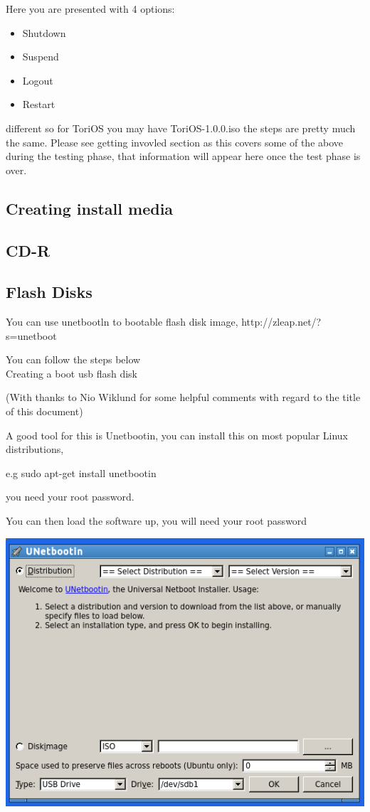 \documentclass[12pt,a4paper]{book}
\begin{document}
Here you are presented with 4 options:\\
\begin{itemize}
\item{Shutdown}
\item{Suspend}
\item{Logout}
\item{Restart}

\end{itemize}
 different so for ToriOS you may have ToriOS-1.0.0.iso the steps are pretty much the same.  
Please see getting invovled section as this covers some of the above during the testing phase,  that information will appear here once the test phase is over. 
\subsection{Creating install media}

\subsection{CD-R}


\subsection{Flash Disks}

You can use unetbootln to bootable flash disk image,   http://zleap.net/?s=unetboot

You can follow the steps below \\

Creating a boot usb flash disk

(With thanks to Nio Wiklund for some helpful comments with regard to the title of this document)

A good tool for this is Unetbootin,  you can install this on most popular Linux distributions,

e.g sudo apt-get install unetbootin

you need your root password.

You can then load the software up, you will need your root password

\newpage




\begin{center}
\includegraphics[width=0.7\linewidth]{unetbootin} 
\end{center}
\end{document}

